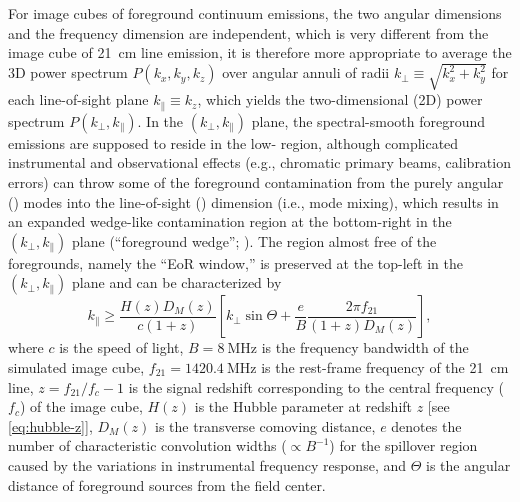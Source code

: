 \documentclass[modern]{aastex62}
\newcommand{\klos}{\text{$k_{\parallel}$}}
\newcommand{\kperp}{\text{$k_{\bot}$}}
\begin{document}
{\color{cyan}%
For image cubes of foreground continuum emissions, the two angular
dimensions and the frequency dimension are independent, which is very
different from the image cube of 21~cm line emission, it is therefore
more appropriate to average the 3D power spectrum $P(k_x, k_y, k_z)$}
over angular annuli of radii $\kperp \equiv \sqrt{k_x^2 + k_y^2}$
for each line-of-sight plane $\klos \equiv k_z$, which yields the
two-dimensional (2D) power spectrum $P(\kperp, \klos)$.
In the $(\kperp, \klos)$ plane, the spectral-smooth foreground emissions
are supposed to reside in the low-\klos{} region, although complicated
instrumental and observational effects (e.g., chromatic primary beams,
calibration errors) can throw some of the foreground contamination from
the purely angular (\kperp) modes into the line-of-sight (\klos)
dimension (i.e., mode mixing), which results in an expanded wedge-like
contamination region at the bottom-right in the $(\kperp, \klos)$ plane
(\enquote{foreground wedge}; \citealt{datta2010,morales2012,liu2014}).
The region almost free of the foregrounds, namely the \enquote{EoR window,}
is preserved at the top-left in the $(\kperp, \klos)$ plane and can be
characterized by \citep{thyagarajan2013}
\begin{equation}
  \label{eq:eor-window}
  \klos \geq \frac{H(z) D_{\!M}(z)}{c (1+z)} \left[
    \kperp \sin\Theta +
    \frac{e}{B} \frac{2\pi f_{21}}{(1+z) D_{\!M}(z)} \right],
\end{equation}
where
$c$ is the speed of light,
$B = \SI{8}{\MHz}$ is the frequency bandwidth of the simulated image cube,
$f_{21} = \SI{1420.4}{\MHz}$ is the rest-frame frequency of the 21~cm line,
$z = f_{21}/f_c - 1$ is the signal redshift corresponding to the central
frequency ($f_c$) of the image cube,
$H(z)$ is the Hubble parameter at redshift $z$ [see \autoref{eq:hubble-z}],
$D_{\!M}(z)$ is the transverse comoving distance,
$e$ denotes the number of characteristic convolution widths
($\propto B^{-1}$) for the spillover region caused by the variations in
instrumental frequency response,
and $\Theta$ is the angular distance of foreground sources from the
field center.
\end{document}
